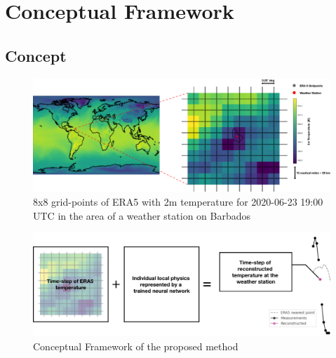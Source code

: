 \section{Conceptual Framework}
\label{sec: design}

\subsection{Concept}

\begin{figure}
    \centering
    \includegraphics[width=\textwidth]{resources/images/ERA5_tas_around_barbados.png}
    \caption{8x8 grid-points of ERA5 with 2m temperature 
    for 2020-06-23 19:00 UTC  in the area of a weather station on Barbados}    
    \label{fig:barbados}
\end{figure}

\begin{figure}
    \centering
    \includegraphics[width=450pt]{resources/images/digitaltwin_schema.png}
    \caption{Conceptual Framework of the proposed method}    
    \label{fig:concept}
\end{figure}

